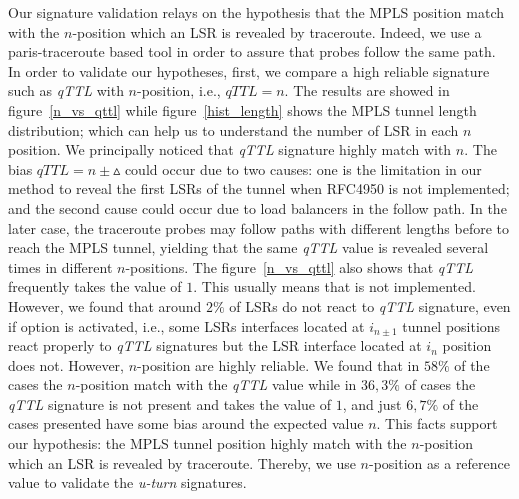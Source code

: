 Our signature validation relays on the hypothesis that the MPLS position match
with the $n$-position  which an LSR is revealed by traceroute. Indeed,
we use a paris-traceroute \cite{BRICE06}  based tool in order to assure that probes follow the
same path. In order to validate our hypotheses, first, we compare a high reliable signature such as \textit{qTTL} with  $n$-position,
%
i.e., $\textit{qTTL}=n$. 
The results are showed in figure~\ref{n_vs_qttl} while figure~\ref{hist_length} shows the MPLS tunnel length distribution; which can help us to understand the number of LSR in each $n$ position. We principally noticed that \textit{qTTL} signature highly match with $n$.%
The bias $\textit{qTTL}=n \pm \vartriangle $ could occur due to two causes: one  is the limitation in our method to reveal the first LSRs of the
tunnel when RFC4950 is not implemented; %
and the second cause could occur due to load balancers in the follow path. 
In the later case, the traceroute probes may follow paths with different lengths before to reach the MPLS tunnel, yielding that the same \textit{qTTL} value is revealed several times in different $n$-positions. 
The figure~\ref{n_vs_qttl} also shows that \textit{qTTL} frequently takes the value of $1$. 
This usually  means that \tpropagate is not implemented. However, we found that around $2\%$ of LSRs do not react to \textit{qTTL} signature, even if \tpropagate option is activated, i.e., some LSRs interfaces located at $i_{n\pm 1}$ tunnel positions react properly to \textit{qTTL} signatures but the LSR interface located at $i_n$ position does not.
However, $n$-position are highly reliable. We found that in $58\%$ of the cases the $n$-position match with the \textit{qTTL} value while in $36,3\%$ of cases the \textit{qTTL} signature is not present and takes the value of $1$, and just $6,7\%$ of the cases presented have some bias around the expected value $n$. 
This facts support our hypothesis: the  MPLS tunnel position highly match with the $n$-position  which an LSR is revealed by traceroute. 
Thereby,  we use $n$-position as a reference value to validate the \textit{u-turn} signatures.


